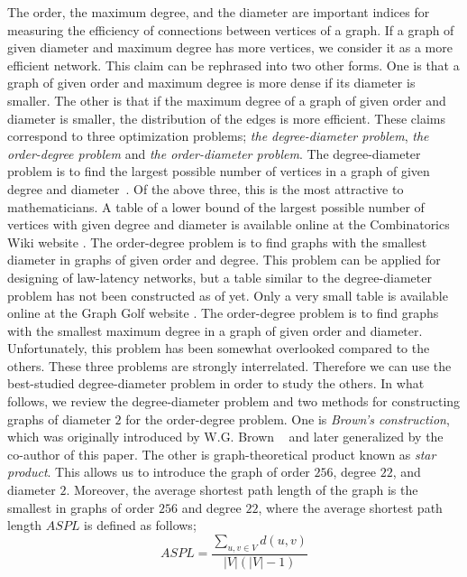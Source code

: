 \documentclass[conference]{IEEEtran}
\begin{document}
The order, the maximum degree, and the diameter are important indices for measuring
the efficiency of connections between vertices of a graph.
If a graph of given diameter and maximum degree has more vertices, we consider it as a more efficient network.
This claim can be rephrased into two other forms.
One is that a graph of given order and maximum degree is more dense if its diameter is smaller.
The other is that if the maximum degree of a graph of given order and diameter is smaller,
the distribution of the edges is more efficient.
These claims correspond to three optimization problems; {\it the degree-diameter problem},
{\it the order-degree problem} and {\it the order-diameter problem}.
The degree-diameter problem is to find the largest possible number of vertices in a graph of given degree and diameter~\cite{MilSir2005}.
Of the above three, this is the most attractive to mathematicians.
A table of a lower bound of the largest possible number of vertices with given degree and diameter is available online at the Combinatorics Wiki website \cite{combinatoricswiki}.
The order-degree problem is to find graphs with the smallest diameter in graphs of given order and degree.
This problem can be applied for designing of law-latency networks, but a table similar to the degree-diameter problem has not been constructed as of yet. 
Only a very small table is available online at the Graph Golf website \cite{graphgolf}.
The order-degree problem is to find graphs with the smallest maximum degree in a graph of given order and diameter.
Unfortunately, this problem has been somewhat overlooked compared to the others.
These three problems are strongly interrelated.
Therefore we can use the best-studied degree-diameter problem in order to study the others.
In what follows, we review the degree-diameter problem and two methods for constructing graphs of diameter $2$ for the order-degree problem.
One is {\it Brown's construction}, which was originally introduced by W.G. Brown ~\cite{brown1966graphs}
and later generalized by the co-author\cite{gbc} of this paper.
The other is graph-theoretical product known as {\it star product}\cite{bermond1982large,MilSir2005}.
This allows us to introduce the graph of order $256$, degree $22$, and diameter $2$.
Moreover, the average shortest path length of the graph is the smallest in graphs of order $256$ and degree $22$,
where the average shortest path length $ASPL$ is defined as follows;
\[ ASPL = \frac{\sum_{u, v \in V} d(u, v)}{|V| (|V| -1)} \]
\end{document}
